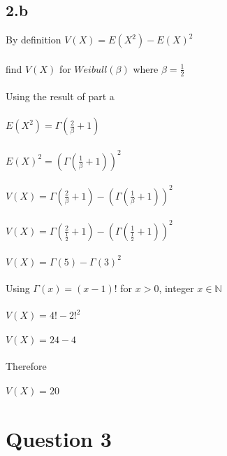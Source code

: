 \documentclass[11pt]{article}   	%
\begin{document}
\subsection*{2.b}

By definition $ V(X) = E(X^2) - E(X)^2 $ \\
\\
find $ V(X) $ for $ Weibull(\beta) $ where $ \beta = \frac{1}{2} $ \\
\\
Using the result of part a \\
\\
$ E(X^2) = \Gamma(\frac{2}{\beta} + 1) $ \\
\\
$ E(X)^2 = (\Gamma(\frac{1}{\beta} + 1))^2 $ \\
\\
$ V(X) = \Gamma(\frac{2}{\beta} + 1) - (\Gamma(\frac{1}{\beta} + 1))^2 $ \\
\\
$ V(X) = \Gamma(\frac{2}{\frac{1}{2}} + 1) - (\Gamma(\frac{1}{\frac{1}{2}} + 1))^2 $ \\
\\
$ V(X) = \Gamma(5) - \Gamma(3)^2 $ \\
\\
Using $ \Gamma(x) = (x-1)! $ for $ x > 0 $, integer $ x \in \mathbb{N} $ \\
\\
$ V(X) = 4! - 2!^2 $ \\
\\
$ V(X) = 24 - 4 $ \\
\\
Therefore \\
\\
$ V(X) = 20 $ \\

\break 


\section*{Question 3}
\end{document}
